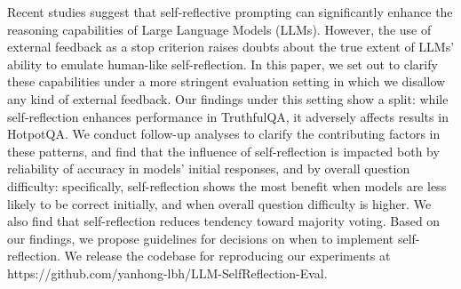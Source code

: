 Recent studies suggest that self-reflective prompting can significantly enhance the reasoning capabilities of Large Language Models (LLMs). However, the use of external feedback as a stop criterion raises doubts about the true extent of LLMs' ability to emulate human-like self-reflection. In this paper, we set out to clarify these capabilities under a more stringent evaluation setting in which we disallow any kind of external feedback. Our findings under this setting show a split: while self-reflection enhances performance in TruthfulQA, it adversely affects results in HotpotQA. We conduct follow-up analyses to clarify the contributing factors in these patterns, and find that the influence of self-reflection is impacted both by reliability of accuracy in models' initial responses, and by overall question difficulty: specifically, self-reflection shows the most benefit when models are less likely to be correct initially, and when overall question difficulty is higher. We also find that self-reflection reduces tendency toward majority voting. Based on our findings, we propose guidelines for decisions on when to implement self-reflection. We release the codebase for reproducing our experiments at https://github.com/yanhong-lbh/LLM-SelfReflection-Eval.